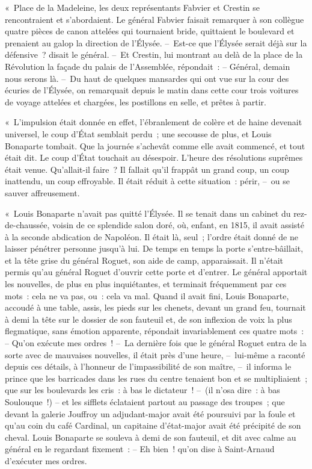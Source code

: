 \documentclass[french,twoside]{book} %
\begin{document}
\noindent « Place de la Madeleine, les deux représentants Fabvier et Crestin se rencontraient et s’abordaient. Le général Fabvier faisait remarquer à son collègue quatre pièces de canon attelées qui tournaient bride, quittaient le boulevard et prenaient au galop la direction de l’Élysée. – Est-ce que l’Élysée serait déjà sur la défensive ? disait le général. – Et Crestin, lui montrant au delà de la place de la Révolution la façade du palais de l’Assemblée, répondait : – Général, demain nous serons là. – Du haut de quelques mansardes qui ont vue sur la cour des écuries de l’Élysée, on remarquait depuis le matin dans cette cour trois voitures de voyage attelées et chargées, les postillons en selle, et prêtes à partir.\par
« L’impulsion était donnée en effet, l’ébranlement de colère et de haine devenait universel, le coup d’État semblait perdu ; une secousse de plus, et Louis Bonaparte tombait. Que la journée s’achevât comme elle avait commencé, et tout était dit. Le coup d’État touchait au désespoir. L’heure des résolutions suprêmes était venue. Qu’allait-il faire ? Il fallait qu’il frappât un grand coup, un coup inattendu, un coup effroyable. Il était réduit à cette situation : périr, – ou se sauver affreusement.\par
« Louis Bonaparte n’avait pas quitté l’Élysée. Il se tenait dans un cabinet du rez-de-chaussée, voisin de ce splendide salon doré, où, enfant, en 1815, il avait assisté à la seconde abdication de Napoléon. Il était là, seul ; l’ordre était donné de ne laisser pénétrer personne jusqu’à lui. De temps en temps la porte s’entre-bâillait, et la tête grise du général Roguet, son aide de camp, apparaissait. Il n’était permis qu’au général Roguet d’ouvrir cette porte et d’entrer. Le général apportait les nouvelles, de plus en plus inquiétantes, et terminait fréquemment par ces mots : cela ne va pas, ou : cela va mal. Quand il avait fini, Louis Bonaparte, accoudé à une table, assis, les pieds sur les chenets, devant un grand feu, tournait à demi la tête sur le dossier de son fauteuil et, de son inflexion de voix la plus flegmatique, sans émotion apparente, répondait invariablement ces quatre mots : – Qu’on exécute mes ordres ! – La dernière fois que le général Roguet entra de la sorte avec de mauvaises nouvelles, il était près d’une heure, – lui-même a raconté depuis ces détails, à l’honneur de l’impassibilité de son maître, – il informa le prince que les barricades dans les rues du centre tenaient bon et se multipliaient ; que sur les boulevards les cris : à bas le dictateur ! – (il n’osa dire : à bas Soulouque !) – et les sifflets éclataient partout au passage des troupes ; que devant la galerie Jouffroy un adjudant-major avait été poursuivi par la foule et qu’au coin du café Cardinal, un capitaine d’état-major avait été précipité de son cheval. Louis Bonaparte se souleva à demi de son fauteuil, et dit avec calme au général en le regardant fixement : – Eh bien ! qu’on dise à Saint-Arnaud d’exécuter mes ordres.\par
\end{document}
